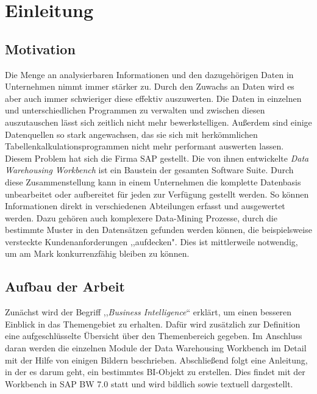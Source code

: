 \chapter{Einleitung}
\label{Kapitel:Einleitung}


\section{Motivation}
 
Die Menge an analysierbaren  Informationen und den dazugehörigen Daten in Unternehmen nimmt immer stärker zu.  Durch den Zuwachs an Daten wird es aber auch immer schwieriger diese effektiv auszuwerten. Die  Daten in einzelnen und unterschiedlichen Programmen zu verwalten und zwischen diesen auszutauschen lässt sich zeitlich nicht mehr bewerkstelligen. Außerdem sind einige Datenquellen so stark angewachsen, das sie sich mit herkömmlichen Tabellenkalkulationsprogrammen nicht mehr performant auswerten lassen. \\
Diesem Problem hat sich die Firma SAP gestellt. Die von ihnen entwickelte \textit{Data Warehousing Workbench} ist ein Baustein der gesamten Software Suite.  Durch diese Zusammenstellung kann in einem  Unternehmen die komplette Datenbasis unbearbeitet oder aufbereitet für jeden zur Verfügung gestellt werden. So können Informationen direkt in verschiedenen Abteilungen erfasst und ausgewertet werden. Dazu gehören auch komplexere Data-Mining Prozesse, durch die bestimmte Muster in den Datensätzen gefunden werden können, die beispielsweise versteckte Kundenanforderungen ,,aufdecken".  Dies ist mittlerweile notwendig, um am Mark konkurrenzfähig bleiben zu können. \cite[S. 46 f.]{Herschel:2013kz}
 \pagebreak
 
\section{ Aufbau der Arbeit}

Zunächst wird der Begriff ,,\textit{Business Intelligence}`` erklärt, um einen besseren Einblick in das Themengebiet zu erhalten. Dafür wird zusätzlich zur Definition  eine aufgeschlüsselte Übersicht über den Themenbereich gegeben. Im Anschluss daran werden die einzelnen Module der Data Warehousing Workbench im Detail mit der Hilfe von einigen Bildern beschrieben. Abschließend folgt eine Anleitung, in der es darum geht, ein bestimmtes BI-Objekt zu erstellen. Dies findet mit der Workbench in SAP BW 7.0 statt und wird bildlich sowie textuell dargestellt.